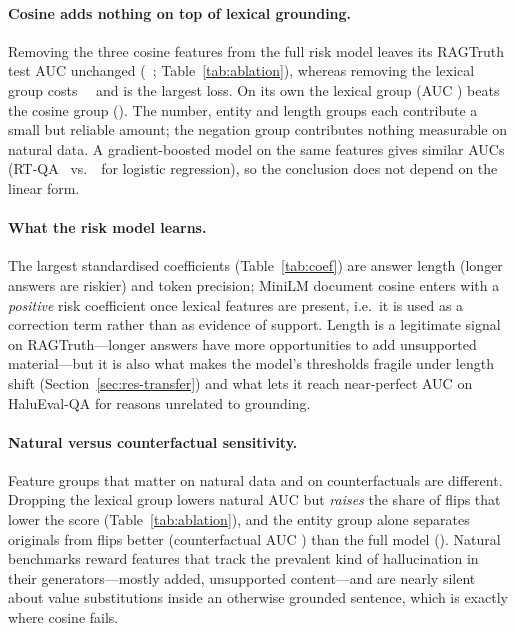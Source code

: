 \paragraph{Cosine adds nothing on top of lexical grounding.} Removing the three cosine features from the full risk model leaves its RAGTruth test AUC unchanged (\AblMinusCosineLoss\ \AblMinusCosineLossCi; Table~\ref{tab:ablation}), whereas removing the lexical group costs \AblMinusLexicalLoss\ \AblMinusLexicalLossCi\ and is the largest loss. On its own the lexical group (AUC \AblOnlyLexicalAuc) beats the cosine group (\AblOnlyCosineAuc). The number, entity and length groups each contribute a small but reliable amount; the negation group contributes nothing measurable on natural data. A gradient-boosted model on the same features gives similar AUCs (RT-QA \GbmQaAuc\ vs.\ \LrQaAuc\ for logistic regression), so the conclusion does not depend on the linear form.

\paragraph{What the risk model learns.} The largest standardised coefficients (Table~\ref{tab:coef}) are answer length (longer answers are riskier) and token precision; MiniLM document cosine enters with a \emph{positive} risk coefficient once lexical features are present, i.e.\ it is used as a correction term rather than as evidence of support. Length is a legitimate signal on RAGTruth---longer answers have more opportunities to add unsupported material---but it is also what makes the model's thresholds fragile under length shift (Section~\ref{sec:res-transfer}) and what lets it reach near-perfect AUC on HaluEval-QA for reasons unrelated to grounding.

\paragraph{Natural versus counterfactual sensitivity.} Feature groups that matter on natural data and on counterfactuals are different. Dropping the lexical group lowers natural AUC but \emph{raises} the share of flips that lower the score (Table~\ref{tab:ablation}), and the entity group alone separates originals from flips better (counterfactual AUC \AblOnlyEntityCfAuc) than the full model (\AblFullCfAuc). Natural benchmarks reward features that track the prevalent kind of hallucination in their generators---mostly added, unsupported content---and are nearly silent about value substitutions inside an otherwise grounded sentence, which is exactly where cosine fails.

